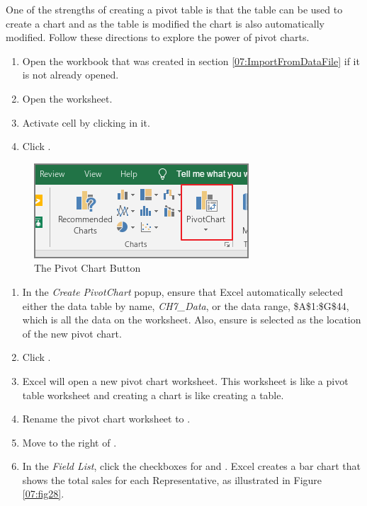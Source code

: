 One of the strengths of creating a pivot table is that the table can be used to create a chart and as the table is modified the chart is also automatically modified. Follow these directions to explore the power of pivot charts.

\begin{enumerate}
	\item Open the  workbook that was created in section \ref{07:ImportFromDataFile} if it is not already opened.
	\item Open the  worksheet.
	\item Activate cell  by clicking in it.  
	\item Click .
\end{enumerate}

\begin{figure}[H]
	\centering
	\includegraphics[width=\maxwidth{.95\linewidth}]{gfx/ch07_fig27}
	\caption{The Pivot Chart Button}
	\label{07:fig27}
\end{figure}

\begin{enumerate}[resume]	
	\item In the \textit{Create PivotChart} popup, ensure that Excel automatically selected either the data table by name, \textit{CH7\_Data}, or the data range, \$A\$1:\$G\$44, which is all the data on the worksheet. Also, ensure  is selected as the location of the new pivot chart.
	\item Click .
	\item Excel will open a new pivot chart worksheet. This worksheet is like a pivot table worksheet and creating a chart is like creating a table.
	\item Rename the pivot chart worksheet to . 
	\item Move  to the right of .
	\item In the \textit{Field List}, click the checkboxes for  and . Excel creates a bar chart that shows the total sales for each Representative, as illustrated in Figure \ref{07:fig28}.
\end{enumerate}	

